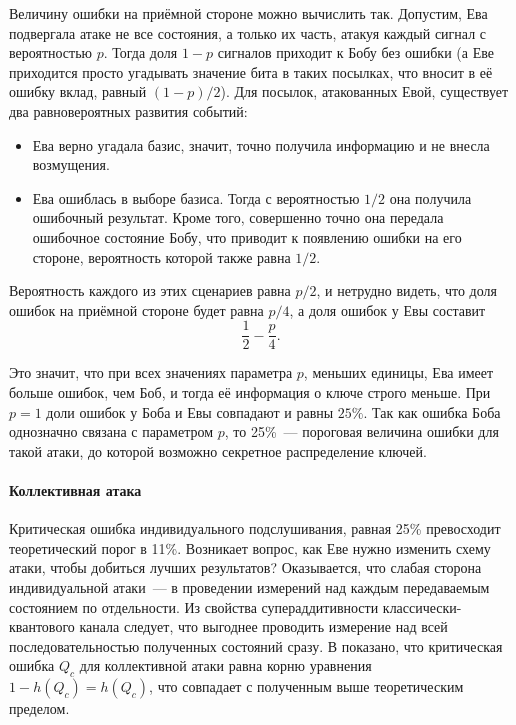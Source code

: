 Величину ошибки на приёмной стороне можно вычислить так. Допустим, Ева подвергала атаке не все состояния, а только их часть, атакуя каждый сигнал с вероятностью $p$. Тогда доля $1-p$ сигналов приходит к Бобу без ошибки (а Еве приходится просто угадывать значение бита в таких посылках, что вносит в её ошибку вклад, равный $(1-p)/2$). 
Для посылок, атакованных Евой, существует два равновероятных развития событий:
\begin{itemize}
  \item Ева верно угадала базис, значит, точно получила информацию и не внесла возмущения.
  \item Ева ошиблась в выборе базиса. Тогда с вероятностью $1/2$ она получила ошибочный результат. Кроме того, совершенно точно она передала ошибочное состояние Бобу, что приводит к появлению ошибки на его стороне, вероятность которой также равна $1/2$. 
\end{itemize}

Вероятность каждого из этих сценариев равна $p/2$, и нетрудно видеть, что доля ошибок на приёмной стороне будет равна $p/4$, а доля ошибок у Евы составит \begin{equation}\frac{1}{2} - \frac{p}{4}.\end{equation}

Это значит, что при всех значениях параметра $p$, меньших единицы, Ева имеет больше ошибок, чем Боб, и тогда её информация о ключе строго меньше. При $p=1$ доли ошибок у Боба и Евы совпадают и равны $25\%$. Так как ошибка Боба однозначно связана с параметром $p$, то 25\%~--- пороговая величина ошибки для такой атаки, до которой возможно секретное распределение ключей.

\paragraph{Коллективная атака}
Критическая ошибка индивидуального подслушивания, равная 25\% превосходит теоретический порог в 11\%. Возникает вопрос, как Еве нужно изменить схему атаки, чтобы добиться лучших результатов? Оказывается, что слабая сторона индивидуальной атаки~--- в проведении измерений над каждым передаваемым состоянием по отдельности. Из свойства супераддитивности  классически-квантового канала\cite{holevo} следует, что выгоднее проводить измерение над всей последовательностью полученных состояний сразу. В \cite{bb84_collective_attack} показано, что критическая ошибка $Q_c$ для коллективной атаки равна корню уравнения $1 - h(Q_c) = h(Q_c)$, что совпадает с полученным выше теоретическим пределом.


